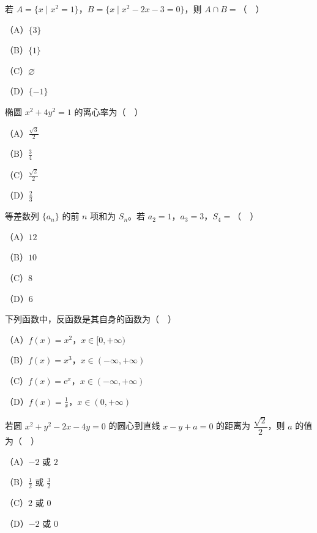 


\begin{question}
若 $A=\{x\mid x^2=1\}$，$B=\{x\mid x^2-2x-3=0\}$，则 $A\cap B=$（　）

（A）$\{3\}$

（B）$\{1\}$

（C）$\varnothing$

（D）$\{-1\}$

\end{question}
\begin{question}
椭圆 $x^2+4y^2=1$ 的离心率为（　）

（A）$\frac{\sqrt3}{2}$

（B）$\frac34$

（C）$\frac{\sqrt2}{2}$

（D）$\frac23$

\end{question}
\begin{question}
等差数列 $\{a_n\}$ 的前 $n$ 项和为 $S_n$。若 $a_2=1$，$a_3=3$，$S_4=$（　）

（A）$12$

（B）$10$

（C）$8$

（D）$6$

\end{question}
\begin{question}
下列函数中，反函数是其自身的函数为（　）

（A）$f(x)=x^2$，$x\in[0,+\infty)$

（B）$f(x)=x^3$，$x\in(-\infty,+\infty)$

（C）$f(x)=\mathrm e^x$，$x\in(-\infty,+\infty)$

（D）$f(x)=\frac1x$，$x\in(0,+\infty)$

\end{question}
\begin{question}
若圆 $x^2+y^2-2x-4y=0$ 的圆心到直线 $x-y+a=0$ 的距离为 $\dfrac{\sqrt2}{2}$，则 $a$ 的值为（　）

（A）$-2$ 或 $2$

（B）$\frac12$ 或 $\frac32$

（C）$2$ 或 $0$

（D）$-2$ 或 $0$

\end{question}
